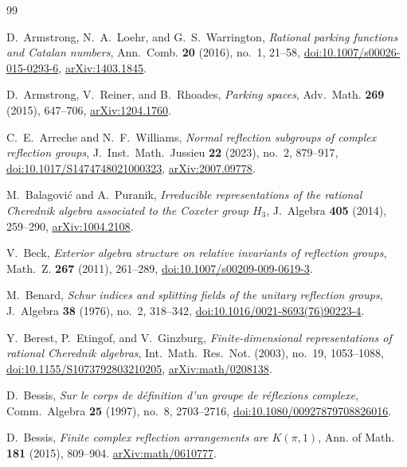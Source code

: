 \documentclass[11pt]{amsart}
\theoremstyle{definition}
\begin{document}
\clearpage
\begingroup\raggedbottom
\begin{thebibliography}{99}
\raggedright
{}
D.~Armstrong, N.~A.~Loehr, and G.~S.~Warrington,
\emph{Rational parking functions and Catalan numbers},
Ann.~Comb. \textbf{20} (2016), no.~1, 21--58,
\href{https://doi.org/10.1007/s00026-015-0293-6}{doi:10.1007/s00026-015-0293-6},
\href{https://arxiv.org/abs/1403.1845}{arXiv:1403.1845}.

D.~Armstrong, V.~Reiner, and B.~Rhoades,
\emph{Parking spaces}, Adv.~Math. \textbf{269} (2015), 647--706,
\href{https://arxiv.org/abs/1204.1760}{arXiv:1204.1760}.

C.~E.~Arreche and N.~F.~Williams,
\emph{Normal reflection subgroups of complex reflection groups},
J.~Inst.~Math.~Jussieu \textbf{22} (2023), no.~2, 879--917,
\href{https://doi.org/10.1017/S1474748021000323}{doi:10.1017/S1474748021000323},
\href{https://arxiv.org/abs/2007.09778}{arXiv:2007.09778}.

M.~Balagovi\'c and A.~Puranik,
\emph{Irreducible representations of the rational Cherednik algebra
associated to the Coxeter group $H_3$},
J.~Algebra \textbf{405} (2014), 259--290,
\href{https://arxiv.org/abs/1004.2108}{arXiv:1004.2108}.

V.~Beck,
\emph{Exterior algebra structure on relative invariants of reflection groups},
Math.~Z. \textbf{267} (2011), 261--289,
\href{https://doi.org/10.1007/s00209-009-0619-3}{doi:10.1007/s00209-009-0619-3}.

M.~Benard,
\emph{Schur indices and splitting fields of the unitary reflection groups},
J.~Algebra \textbf{38} (1976), no.~2, 318--342,
\href{https://doi.org/10.1016/0021-8693(76)90223-4}{doi:10.1016/0021-8693(76)90223-4}.

Y.~Berest, P.~Etingof, and V.~Ginzburg,
\emph{Finite-dimensional representations of rational Cherednik algebras},
Int.~Math.~Res.~Not. (2003), no.~19, 1053--1088,
\href{https://doi.org/10.1155/S1073792803210205}{doi:10.1155/S1073792803210205},
\href{https://arxiv.org/abs/math/0208138}{arXiv:math/0208138}.

D.~Bessis,
\emph{Sur le corps de d\'efinition d'un groupe de r\'eflexions complexe},
Comm.~Algebra \textbf{25} (1997), no.~8, 2703--2716,
\href{https://doi.org/10.1080/00927879708826016}{doi:10.1080/00927879708826016}.

D.~Bessis,
\emph{Finite complex reflection arrangements are $K(\pi,1)$},
Ann. of Math. \textbf{181} (2015), 809--904.
\href{https://arxiv.org/abs/math/0610777}{arXiv:math/0610777}.


\end{thebibliography}
\end{document}
